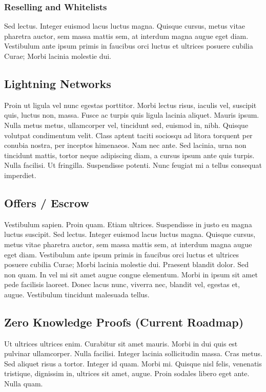 \documentclass[peerreview]{ieeesyscoin}
\begin{document}
\subsubsection{Reselling and Whitelists}

Sed lectus. Integer euismod lacus luctus magna. Quisque cursus, metus vitae pharetra auctor, sem massa mattis sem, at interdum magna augue eget diam. Vestibulum ante ipsum primis in faucibus orci luctus et ultrices posuere cubilia Curae; Morbi lacinia molestie dui. 

\subsection{Lightning Networks}
Proin ut ligula vel nunc egestas porttitor. Morbi lectus risus, iaculis vel, suscipit quis, luctus non, massa. Fusce ac turpis quis ligula lacinia aliquet. Mauris ipsum. Nulla metus metus, ullamcorper vel, tincidunt sed, euismod in, nibh. Quisque volutpat condimentum velit. Class aptent taciti sociosqu ad litora torquent per conubia nostra, per inceptos himenaeos. Nam nec ante. Sed lacinia, urna non tincidunt mattis, tortor neque adipiscing diam, a cursus ipsum ante quis turpis. Nulla facilisi. Ut fringilla. Suspendisse potenti. Nunc feugiat mi a tellus consequat imperdiet. 

\subsection{Offers / Escrow}
Vestibulum sapien. Proin quam. Etiam ultrices. Suspendisse in justo eu magna luctus suscipit. Sed lectus. Integer euismod lacus luctus magna. Quisque cursus, metus vitae pharetra auctor, sem massa mattis sem, at interdum magna augue eget diam. Vestibulum ante ipsum primis in faucibus orci luctus et ultrices posuere cubilia Curae; Morbi lacinia molestie dui. Praesent blandit dolor. Sed non quam. In vel mi sit amet augue congue elementum. Morbi in ipsum sit amet pede facilisis laoreet. Donec lacus nunc, viverra nec, blandit vel, egestas et, augue. Vestibulum tincidunt malesuada tellus. 

\subsection{Zero Knowledge Proofs (Current Roadmap)}
Ut ultrices ultrices enim. Curabitur sit amet mauris. Morbi in dui quis est pulvinar ullamcorper. Nulla facilisi. Integer lacinia sollicitudin massa. Cras metus. Sed aliquet risus a tortor. Integer id quam. Morbi mi. Quisque nisl felis, venenatis tristique, dignissim in, ultrices sit amet, augue. Proin sodales libero eget ante. Nulla quam. 
\end{document}
